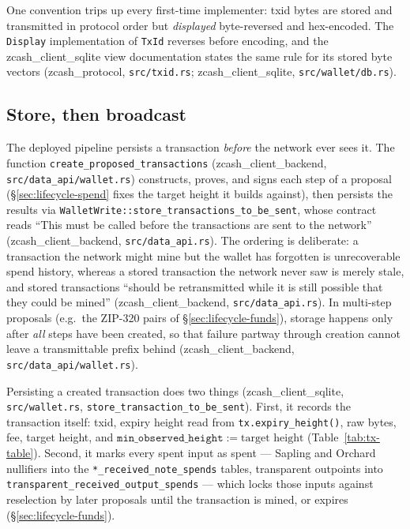\documentclass[11pt,a4paper]{article}
\theoremstyle{definition}
\begin{document}
One convention trips up every first-time implementer: txid bytes are stored
and transmitted in protocol order but \emph{displayed} byte-reversed and
hex-encoded. The \texttt{Display} implementation of \texttt{TxId} reverses
before encoding, and the \textsf{zcash\_client\_sqlite} view documentation
states the same rule for its stored byte vectors (\textsf{zcash\_protocol},
\texttt{src/txid.rs}; \textsf{zcash\_client\_sqlite},
\texttt{src/wallet/db.rs}).

\subsection{Store, then broadcast}\label{sec:lifecycle-broadcast}

The deployed pipeline persists a transaction \emph{before} the network ever
sees it. The function \texttt{create\_proposed\_transactions}
(\textsf{zcash\_client\_backend}, \texttt{src/data\_api/wallet.rs})
constructs, proves, and signs each step of a proposal
(\S\ref{sec:lifecycle-spend} fixes the target height it builds against),
then persists the results via
\texttt{WalletWrite::store\_transactions\_to\_be\_sent}, whose contract
reads ``This must be called before the transactions are sent to the
network'' (\textsf{zcash\_client\_backend}, \texttt{src/data\_api.rs}). The
ordering is deliberate: a transaction the network might mine but the wallet
has forgotten is unrecoverable spend history, whereas a stored transaction
the network never saw is merely stale, and stored transactions ``should be
retransmitted while it is still possible that they could be mined''
(\textsf{zcash\_client\_backend}, \texttt{src/data\_api.rs}). In
multi-step proposals (e.g.\ the ZIP-320 pairs of
\S\ref{sec:lifecycle-funds}), storage happens only after \emph{all} steps
have been created, so that failure partway through creation cannot leave a
transmittable prefix behind (\textsf{zcash\_client\_backend},
\texttt{src/data\_api/wallet.rs}).

Persisting a created transaction does two things
(\textsf{zcash\_client\_sqlite}, \texttt{src/wallet.rs},
\texttt{store\_transaction\_to\_be\_sent}). First, it records the
transaction itself: txid, expiry height read from
\texttt{tx.expiry\_height()}, raw bytes, fee, target height, and
$\mathtt{min\_observed\_height} := \text{target height}$
(Table~\ref{tab:tx-table}). Second, it marks every spent input as spent ---
Sapling and Orchard nullifiers into the \texttt{*\_received\_note\_spends}
tables, transparent outpoints into
\texttt{transparent\_received\_output\_spends} --- which locks those inputs
against reselection by later proposals until the transaction is mined, or
expires (\S\ref{sec:lifecycle-funds}).
\end{document}
